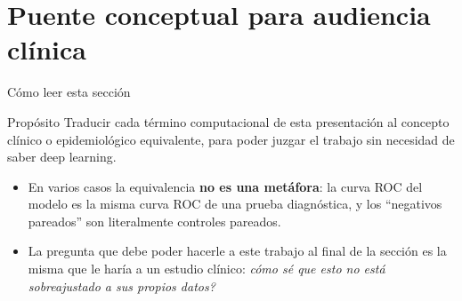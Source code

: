 \section{Puente conceptual para audiencia cl\'inica}


\begin{frame}{C\'omo leer esta secci\'on}
  \begin{block}{Prop\'osito}
    Traducir cada t\'ermino computacional de esta presentaci\'on al concepto cl\'inico o epidemiol\'ogico equivalente, para poder juzgar el trabajo sin necesidad de saber deep learning.
  \end{block}

  \vspace{0.6em}

  \begin{itemize}
    \item En varios casos la equivalencia \textbf{no es una met\'afora}: la curva ROC del modelo es la misma curva ROC de una prueba diagn\'ostica, y los ``negativos pareados'' son literalmente controles pareados.
    \item La pregunta que debe poder hacerle a este trabajo al final de la secci\'on es la misma que le har\'ia a un estudio cl\'inico: \emph{\textquestiondown{}c\'omo s\'e que esto no est\'a sobreajustado a sus propios datos?}
  \end{itemize}
\end{frame}


